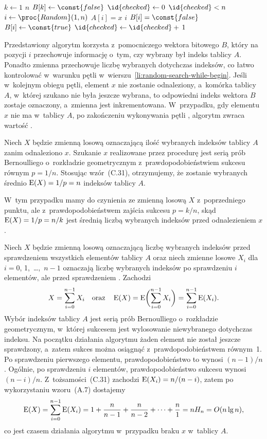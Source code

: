 \subproblem %
\begin{codebox}
\li	\For $k\gets1$ \To $n$
\li		\Do
			$B[k]\gets\const{false}$
		\End
\li	$\id{checked}\gets0$
\li	\While $\id{checked}<n$ \label{li:random-search-while-begin}
\li		\Do
			$i\gets\proc{Random}(1,n)$
\li			\If $A[i]=x$
\li				\Then
					\Return $i$
\li				\ElseIf $B[i]=\const{false}$
\li					\Then
						$B[i]\gets\const{true}$
\li						$\id{checked}\gets\id{checked}+\,1$
				\End
		\End
\li	\Return {}
\end{codebox}
Przedstawiony algorytm korzysta z~pomocniczego wektora bitowego $B$, który na pozycji $i$ przechowuje informację o~tym, czy wybrany był  indeks tablicy $A$. Ponadto zmienna  przechowuje liczbę wybranych dotychczas indeksów, co łatwo kontrolować w~warunku pętli  w~wierszu~\ref{li:random-search-while-begin}. Jeśli w~kolejnym obiegu pętli, element $x$ nie zostanie odnaleziony, a~komórka tablicy $A$, w~której szukano nie była jeszcze wybrana, to odpowiedni indeks wektora $B$ zostaje oznaczony, a~zmienna  jest inkrementowana. W~przypadku, gdy elementu $x$ nie ma w~tablicy $A$, po zakończeniu wykonywania pętli , algorytm zwraca wartość .

\subproblem %
Niech $X$ będzie zmienną losową oznaczającą ilość wybranych indeksów tablicy $A$ zanim odnaleziono $x$. Szukanie $x$ realizowane przez procedurę  jest serią prób Bernoulliego o~rozkładzie geometrycznym z~prawdopodobieństwiem sukcesu równym $p=1/n$. Stosując wzór~(C.31), otrzymujemy, że zostanie wybranych średnio $\operatorname{E}(X)=1/p=n$ indeksów tablicy $A$.

\subproblem %
W~tym przypadku mamy do czynienia ze zmienną losową $X$ z~poprzedniego punktu, ale z~prawdopodobieństwem zajścia sukcesu $p=k/n$, skąd $\operatorname{E}(X)=1/p=n/k$ jest średnią liczbą wybranych indeksów przed odnalezieniem $x$.

\subproblem %
Niech $X$ będzie zmienną losową oznaczającą liczbę wybranych indeksów przed sprawdzeniem wszystkich elementów tablicy $A$ oraz niech zmienne losowe $X_i$ dla $i=0$, 1,~\dots,~$n-1$ oznaczają liczbę wybranych indeksów po sprawdzeniu $i$ elementów, ale przed sprawdzeniem . Zachodzi
\[
	X = \sum_{i=0}^{n-1}X_i \quad\text{oraz}\quad \operatorname{E}(X) = \operatorname{E}\biggl(\sum_{i=0}^{n-1}X_i\biggr) = \sum_{i=0}^{n-1}\operatorname{E}(X_i).
\]
Wybór indeksów tablicy $A$ jest serią prób Bernoulliego o~rozkładzie geometrycznym, w~której sukcesem jest wylosowanie niewybranego dotychczas indeksu. Na początku działania algorytmu żaden element nie został jeszcze sprawdzony, a~zatem sukces można osiągnąć z~prawdopodobieństwem równym~1. Po sprawdzeniu pierwszego elementu, prawdopodobieństwo to wynosi $(n-1)/n$. Ogólnie, po sprawdzeniu $i$ elementów, prawdopodobieństwo sukcesu wynosi $(n-i)/n$. Z~tożsamości~(C.31) zachodzi $\operatorname{E}(X_i)=n/(n-i)$, zatem po wykorzystaniu wzoru~(A.7) dostajemy
\[
	\operatorname{E}(X) = \sum_{i=0}^{n-1}\operatorname{E}(X_i) = 1+\frac{n}{n-1}+\frac{n}{n-2}+\dots+\frac{n}{1} = nH_n = O(n\lg n),
\]
co jest czasem działania algorytmu  w~przypadku braku $x$ w~tablicy $A$.

